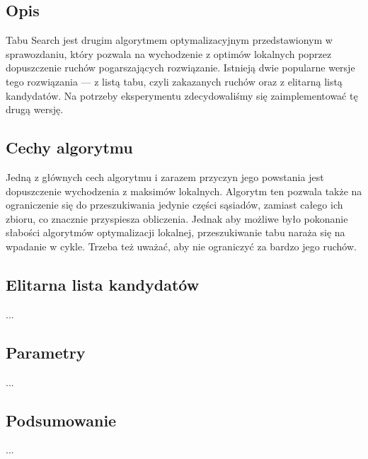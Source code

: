 \subsection{Opis}

Tabu Search jest drugim algorytmem optymalizacyjnym przedstawionym w sprawozdaniu, który pozwala na wychodzenie z optimów lokalnych poprzez dopuszczenie ruchów pogarszających rozwiązanie. Istnieją dwie popularne wersje tego rozwiązania --- z listą tabu, czyli zakazanych ruchów oraz z elitarną listą kandydatów. Na potrzeby eksperymentu zdecydowaliśmy się zaimplementować tę drugą wersję.

\subsection{Cechy algorytmu}

Jedną z głównych cech algorytmu i zarazem przyczyn jego powstania jest dopuszczenie wychodzenia z maksimów lokalnych. Algorytm ten pozwala także na ograniczenie się do przeszukiwania jedynie części sąsiadów, zamiast całego ich zbioru, co znacznie przyspiesza obliczenia. Jednak aby możliwe było pokonanie słabości algorytmów optymalizacji lokalnej, przeszukiwanie tabu naraża się na wpadanie w cykle. Trzeba też uważać, aby nie ograniczyć za bardzo jego ruchów.

\subsection{Elitarna lista kandydatów}

...

\subsection{Parametry}

...

\subsection{Podsumowanie}

...